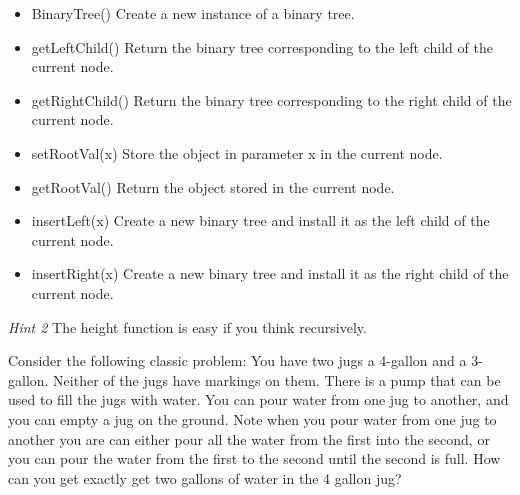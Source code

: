 \documentclass[11pt]{exam}
\begin{document}
\begin{questions}
\begin{itemize}
	\item BinaryTree()  Create a new instance of a binary tree.
    \item getLeftChild() Return the binary tree corresponding to the left child of the current node.
    \item getRightChild() Return the binary tree corresponding to the right child of the current node.
    \item setRootVal(x) Store the object in parameter x in the current node.
    \item getRootVal() Return the object stored in the current node.
    \item insertLeft(x) Create a new binary tree and install it as the left child of the current node.
    \item insertRight(x) Create a new binary tree and install it as the right child of the current node.

\end{itemize}

\textit{Hint 2} The height function is easy if you think recursively.

\newpage
\question  Consider the following classic problem:  You have two jugs a 4-gallon and a 3-gallon. Neither of the jugs have markings on them. There is a pump that can be used to fill the jugs with water. You can pour water from one jug to another, and you can empty a jug on the ground.  Note when you pour water from one jug to another you are can either pour all the water from the first into the second, or you can pour the water from the first to the second until the second is full.  How can you get exactly get two gallons of water in the 4 gallon jug?


\end{questions}
\end{document}
